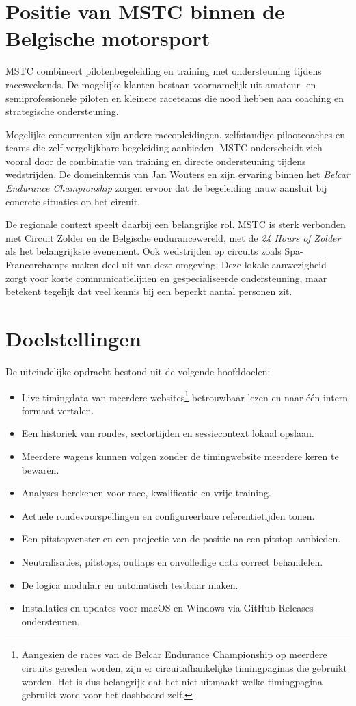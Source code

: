 \section{Positie van MSTC binnen de Belgische motorsport}

MSTC combineert pilotenbegeleiding en training met ondersteuning tijdens raceweekends. De mogelijke klanten bestaan voornamelijk uit amateur- en semiprofessionele piloten en kleinere raceteams die nood hebben aan coaching en strategische ondersteuning.

Mogelijke concurrenten zijn andere raceopleidingen, zelfstandige pilootcoaches en teams die zelf vergelijkbare begeleiding aanbieden. MSTC onderscheidt zich vooral door de combinatie van training en directe ondersteuning tijdens wedstrijden. De domeinkennis van Jan Wouters en zijn ervaring binnen het \emph{Belcar Endurance Championship} zorgen ervoor dat de begeleiding nauw aansluit bij concrete situaties op het circuit.

De regionale context speelt daarbij een belangrijke rol. MSTC is sterk verbonden met Circuit Zolder en de Belgische endurancewereld, met de \emph{24 Hours of Zolder} als het belangrijkste evenement. Ook wedstrijden op circuits zoals Spa-Francorchamps maken deel uit van deze omgeving. Deze lokale aanwezigheid zorgt voor korte communicatielijnen en gespecialiseerde ondersteuning, maar betekent tegelijk dat veel kennis bij een beperkt aantal personen zit.

\section{Doelstellingen}
De uiteindelijke opdracht bestond uit de volgende hoofddoelen:

\begin{itemize}
  \item Live timingdata van meerdere websites\footnote{Aangezien de races van de Belcar Endurance Championship op meerdere circuits gereden worden, zijn er circuitafhankelijke timingpaginas die gebruikt worden. Het is dus belangrijk dat het niet uitmaakt welke timingpagina gebruikt word voor het dashboard zelf.} betrouwbaar lezen en naar één intern formaat vertalen.
  \item Een historiek van rondes, sectortijden en sessiecontext lokaal opslaan.
  \item Meerdere wagens kunnen volgen zonder de timingwebsite meerdere keren te bewaren.
  \item Analyses berekenen voor race, kwalificatie en vrije training.
  \item Actuele rondevoorspellingen en configureerbare referentietijden tonen.
  \item Een pitstopvenster en een projectie van de positie na een pitstop aanbieden.
  \item Neutralisaties, pitstops, outlaps en onvolledige data correct behandelen.
  \item De logica modulair en automatisch testbaar maken.
  \item Installaties en updates voor macOS en Windows via GitHub Releases ondersteunen.
\end{itemize}
